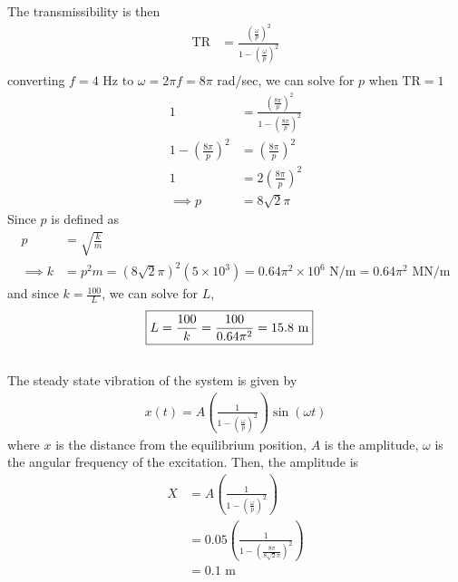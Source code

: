 The transmissibility is then
\begin{align*}
    \text{TR} &= \frac{\left(\frac{\omega}{p}\right)^2}{1 - \left(\frac{\omega}{p}\right)^2} \\
\end{align*}
converting $f = 4$ Hz to $\omega = 2\pi f = 8\pi$ rad/sec, we can solve for $p$ when $\text{TR} = 1$
\begin{align*}
    1 &= \frac{\left(\frac{8\pi}{p}\right)^2}{1 - \left(\frac{8\pi}{p}\right)^2} \\
    1 - \left(\frac{8\pi}{p}\right)^2 &= \left(\frac{8\pi}{p}\right)^2 \\
    1 &= 2\left(\frac{8\pi}{p}\right)^2 \\
    \implies p &= 8\sqrt{2} \pi
\end{align*}
Since $p$ is defined as 
\begin{align*}
    p &= \sqrt{\frac{k}{m}}\\
    \implies k &= p^2m = (8\sqrt{2}\pi)^2 (5 \times 10^3) = 0.64\pi^2 \times 10^6 \text{ N/m} = 0.64\pi^2 \text{ MN/m}
\end{align*}
and since $k = \frac{100}{L}$, we can solve for $L$,
\begin{align*}
    \Aboxed{L &= \frac{100}{k} = \frac{100}{0.64\pi^2} = 15.8 \text{ m}}
\end{align*}

\subsection{}
The steady state vibration of the system is given by
\begin{align*}
    x(t) = A\left(\frac{1}{1 - \left(\frac{\omega}{p}\right)^2}\right)\sin(\omega t)
\end{align*}
where $x$ is the distance from the equilibrium position, $A$ is the amplitude, $\omega$ is the angular frequency of the excitation. Then, the amplitude is 
\begin{align*}
    X &= A \left(\frac{1}{1 - \left(\frac{\omega}{p}\right)^2}\right) \\
    &= 0.05 \left(\frac{1}{1 - \left(\frac{8\pi}{8\sqrt{2}\pi}\right)^2}\right) \\
    &= 0.1 \text{ m}
\end{align*}